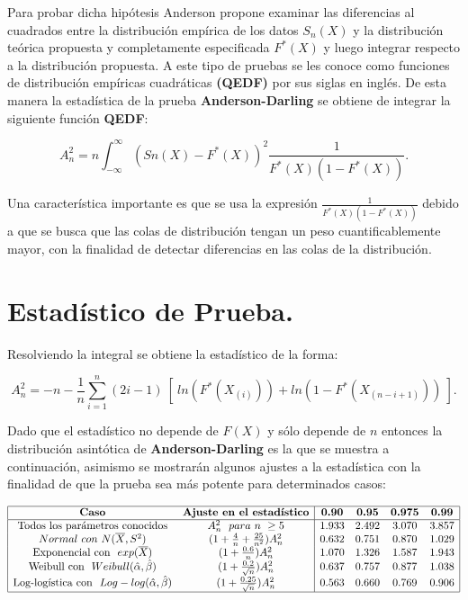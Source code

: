 \documentclass[
  a4paper,
  oneside,
  openany]{book}
\begin{document}
Para probar dicha hipótesis Anderson propone examinar las diferencias al cuadrados entre la distribución empírica de los datos \(S_{n}(X)\) y la distribución teórica propuesta y completamente especificada \(F^*(X)\) y luego integrar respecto a la distribución propuesta.
A este tipo de pruebas se les conoce como funciones de distribución empíricas cuadráticas \textbf{(QEDF)} por sus siglas en inglés.
De esta manera la estadística de la prueba \textbf{Anderson-Darling} se obtiene de integrar la siguiente función \textbf{QEDF}:

\[A_n^2=n \int_{-\infty}^{\infty} (Sn(X)-F^*(X))^2 \frac{1}{F^*(X)(1-F^*(X))}.\]

Una característica importante es que se usa la expresión \(\frac{1}{F^*(X)(1-F^*(X))}\) debido a que se busca que las colas de distribución tengan un peso cuantificablemente mayor, con la finalidad de detectar diferencias en las colas de la distribución.

\hypertarget{estaduxedstico-de-prueba.-1}{%
\section{Estadístico de Prueba.}\label{estaduxedstico-de-prueba.-1}}

Resolviendo la integral se obtiene la estadístico de la forma:

\[A_n^2=-n-\frac{1}{n}\sum_{i=1}^{n}\left(2i-1\right) \ [ \ ln(F^*(X_{(i)})) +ln(1-F^*(X_{(n-i+1)})) \ ].\]

Dado que el estadístico no depende de \(F(X)\) y sólo depende de \(n\) entonces la distribución asintótica de \textbf{Anderson-Darling} es la que se muestra a continuación, asimismo se mostrarán algunos ajustes a la estadística con la finalidad de que la prueba sea más potente para determinados
casos:

\[
\begin{array}{|c c| c c c c|}
\hline
\textbf{Caso} & \textbf{Ajuste en el estadístico} &\textbf{0.90} &\textbf{0.95} & \textbf{0.975} & \textbf{0.99} \\
\hline
\mbox{Todos los parámetros conocidos} & A_{n}^{2} \ \ para\ n\ \geq 5 & 1.933 & 2.492 & 3.070 & 3.857 \\
Normal\ con\ N(\overline{X},S^2) & (1+\frac{4}{n}+\frac{25}{n^2})A_{n}^{2} & 0.632 & 0.751 & 0.870 & 1.029 \\
\mbox{Exponencial con} \ \ exp(\overline{X}) & (1+\frac{0.6}{n})A_{n}^{2} & 1.070 & 1.326 & 1.587 & 1.943 \\
\mbox{Weibull con} \ \ Weibull(\hat{\alpha},\hat{\beta}) & (1+\frac{0.2}{\sqrt{n}})A_{n}^{2} & 0.637 & 0.757 & 0.877 & 1.038 \\
\mbox{Log-logística con} \ \ Log-log(\hat{\alpha},\hat{\beta}) & (1+\frac{0.25}{\sqrt{n}})A_{n}^{2} & 0.563 & 0.660 & 0.769 & 0.906 \\
\hline
\end{array}
\]
\end{document}

